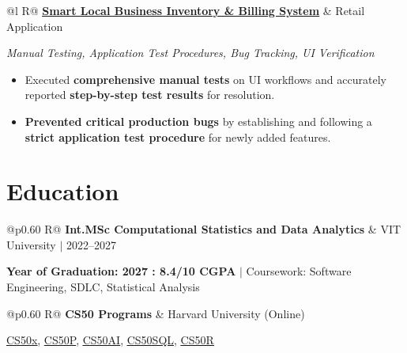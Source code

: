 \documentclass[a4paper,10pt]{article}
\newcommand{\ulink}[2]{\href{#1}{\uline{#2}}}
\newcommand{\subheading}[1]{{\color[HTML]{0A0A0A}\fontsize{12}{14}\selectfont\bfseries #1}}
\newcommand{\techstack}[1]{{\color[HTML]{5C5C5C}\fontsize{10.5}{12.5}\selectfont\itshape #1}}
\newcommand{\meta}[1]{{\color[HTML]{5C5C5C}\fontsize{10.5}{12.5}\selectfont #1}}
\begin{document}
\begin{tabularx}{\linewidth}{@{}l R@{}}
\subheading{\ulink{https://github.com/su-jin1425/Smart-Local-Business-Inventory-Billing-System}{Smart Local Business Inventory \& Billing System}} & \meta{Retail Application}
\end{tabularx}
\vspace{1pt}
\techstack{Manual Testing, Application Test Procedures, Bug Tracking, UI Verification}
\begin{itemize}[nosep, leftmargin=1.5em, itemsep=1pt, topsep=2pt]
  \item {\color[HTML]{0A0A0A}\fontsize{11}{14}\selectfont Executed \textbf{comprehensive manual tests} on UI workflows and accurately reported \textbf{step-by-step test results} for resolution.}
  \item {\color[HTML]{0A0A0A}\fontsize{11}{14}\selectfont \textbf{Prevented critical production bugs} by establishing and following a \textbf{strict application test procedure} for newly added features.}
\end{itemize}

\vspace{2pt}

\section{Education}
\vspace{2pt}

\begin{tabularx}{\linewidth}{@{}p{0.60\linewidth} R@{}}
\subheading{Int.MSc Computational Statistics and Data Analytics} & \meta{VIT University $|$ 2022--2027}
\end{tabularx}
\vspace{1pt}
{\color[HTML]{3A3A3A}\fontsize{11}{14}\selectfont \textbf{Year of Graduation: 2027 : 8.4/10 CGPA} $|$ Coursework: Software Engineering, SDLC, Statistical Analysis}

\begin{tabularx}{\linewidth}{@{}p{0.60\linewidth} R@{}}
\subheading{CS50 Programs} & \meta{Harvard University (Online)}
\end{tabularx}
\vspace{1pt}
{\color[HTML]{3A3A3A}\fontsize{11}{14}\selectfont \ulink{https://cs50.harvard.edu/certificates/b14b78df-e05c-413e-a607-1dd27303053a}{CS50x}, \ulink{https://cs50.harvard.edu/certificates/32477052-9db4-49c4-a5a4-d7e58429ca2c}{CS50P}, \ulink{https://cs50.harvard.edu/certificates/9cdb4d4a-1250-4f8e-9fd7-191864e0f919}{CS50AI}, \ulink{https://cs50.harvard.edu/certificates/bc486f24-f085-4e61-8536-80940b97a1b9}{CS50SQL}, \ulink{https://cs50.harvard.edu/certificates/666838e6-a053-4d82-b179-a60fe745fd84}{CS50R}}
\end{document}
